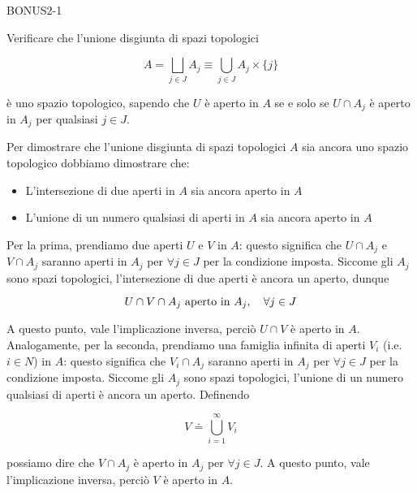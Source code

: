 {BONUS2-1}
{
Verificare che l'unione disgiunta di spazi topologici

\begin{equation}
	A = \bigsqcup_{j \in J} A_{j} \equiv \bigcup_{j \in J} A_{j} \times \{j\}
\end{equation}

è uno spazio topologico, sapendo che $ U $ è aperto in $ A $ se e solo se $ U \cap A_{j} $ è aperto in $ A_{j} $ per qualsiasi $ j \in J $.
}
{
Per dimostrare che l'unione disgiunta di spazi topologici $ A $ sia ancora uno spazio topologico dobbiamo dimostrare che:

\begin{itemize}
	\item L'intersezione di due aperti in $ A $ sia ancora aperto in $ A $
	
	\item L'unione di un numero qualsiasi di aperti in $ A $ sia ancora aperto in $ A $
\end{itemize}

Per la prima, prendiamo due aperti $ U $ e $ V $ in $ A $: questo significa che $ U \cap A_{j} $ e $ V \cap A_{j} $ saranno aperti in $ A_{j} $ per $ \forall j \in J $ per la condizione imposta. Siccome gli $ A_{j} $ sono spazi topologici, l'intersezione di due aperti è ancora un aperto, dunque

\begin{equation}
	U \cap V \cap A_{j} \text{ aperto in } A_{j} \qcomma \forall j \in J
\end{equation}

A questo punto, vale l'implicazione inversa, perciò $ U \cap V $ è aperto in $ A $. \\
Analogamente, per la seconda, prendiamo una famiglia infinita di aperti $ V_{i} $ (i.e. $ i \in N $) in $ A $: questo significa che $ V_{i} \cap A_{j} $ saranno aperti in $ A_{j} $ per $ \forall j \in J $ per la condizione imposta. Siccome gli $ A_{j} $ sono spazi topologici, l'unione di un numero qualsiasi di aperti è ancora un aperto. Definendo

\begin{equation}
	V \doteq \bigcup_{i=1}^{\infty} V_{i}
\end{equation}

possiamo dire che $ V \cap A_{j} $ è aperto in $ A_{j} $ per $ \forall j \in J $. A questo punto, vale l'implicazione inversa, perciò $ V $ è aperto in $ A $.
}

